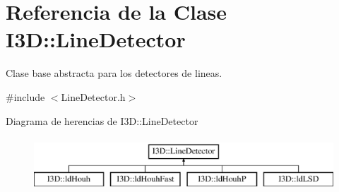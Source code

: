 \hypertarget{class_i3_d_1_1_line_detector}{}\section{Referencia de la Clase I3D\+:\+:Line\+Detector}
\label{class_i3_d_1_1_line_detector}


Clase base abstracta para los detectores de lineas.  




{\ttfamily \#include $<$Line\+Detector.\+h$>$}

Diagrama de herencias de I3D\+:\+:Line\+Detector\begin{figure}[H]
\begin{center}
\leavevmode
\includegraphics[height=2.000000cm]{class_i3_d_1_1_line_detector}
\end{center}
\end{figure}
